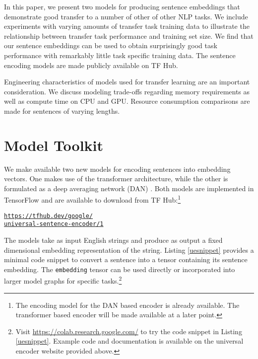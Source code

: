 \documentclass[11pt,a4paper]{article}
\begin{document}
In this paper, we present two models for producing sentence embeddings that demonstrate good transfer to a number of other of other NLP tasks. We include experiments with varying amounts of transfer task training data to illustrate the relationship between transfer task performance and training set size. We find that our sentence embeddings can be used to obtain surprisingly good task performance with remarkably little task specific training data. The sentence encoding models are made publicly available on TF Hub. 

Engineering characteristics of models used for transfer learning are an important consideration. We discuss modeling trade-offs regarding memory requirements as well as compute time on CPU and GPU. Resource consumption comparisons are made for sentences of varying lengths.

\section{Model Toolkit}

We make available two new models for encoding sentences into embedding vectors. One makes use of the transformer \cite{vaswani2017} architecture, while the other is formulated as a deep averaging network (DAN) \cite{iyyer2015}. Both models are implemented in TensorFlow \cite{abadi2016} and are available to download from TF Hub:\footnote{The encoding model for the DAN based encoder is already available. The transformer based encoder will be made available at a later point.} 

\begin{center}
\footnotesize
\texttt{\href{https://tfhub.dev/google/universal-sentence-encoder/1}
       {https://tfhub.dev/google/} \\
       \href{https://tfhub.dev/google/universal-sentence-encoder/1}
       {universal-sentence-encoder/1}}
\end{center}

The models take as input English strings and produce as output a fixed dimensional embedding representation of the string. Listing \ref{uesnippet} provides a minimal code snippet to convert a sentence into a tensor containing its sentence embedding. The {\tt embedding} tensor can be used directly or incorporated into larger model graphs for specific tasks.\footnote{Visit \href{https://colab.research.google.com/}{https://colab.research.google.com/} to try the code snippet in Listing \ref{uesnippet}. Example code and documentation is available on the universal encoder website provided above.}  
\end{document}
